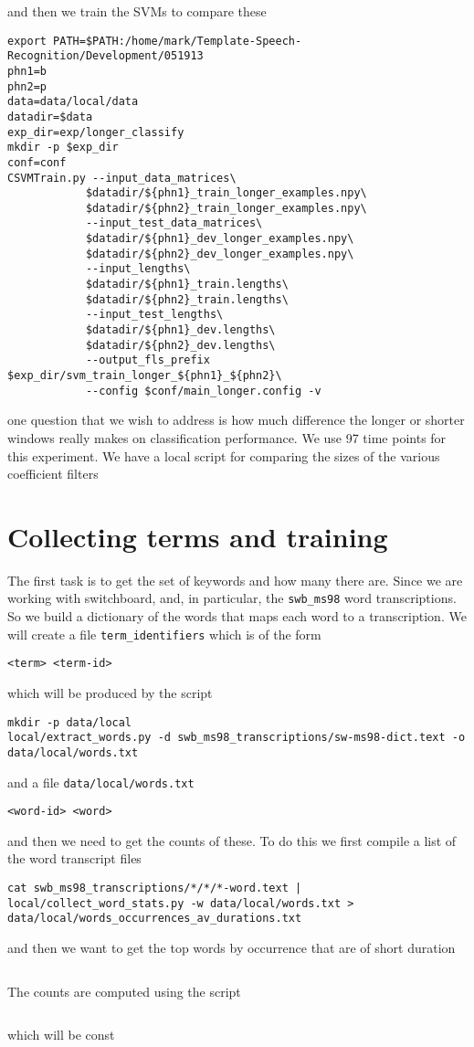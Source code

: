 \documentclass{article}
\begin{document}
and then we train the SVMs to compare these
\begin{verbatim}
export PATH=$PATH:/home/mark/Template-Speech-Recognition/Development/051913
phn1=b
phn2=p
data=data/local/data
datadir=$data
exp_dir=exp/longer_classify
mkdir -p $exp_dir
conf=conf
CSVMTrain.py --input_data_matrices\
            $datadir/${phn1}_train_longer_examples.npy\
            $datadir/${phn2}_train_longer_examples.npy\
            --input_test_data_matrices\
            $datadir/${phn1}_dev_longer_examples.npy\
            $datadir/${phn2}_dev_longer_examples.npy\
            --input_lengths\
            $datadir/${phn1}_train.lengths\
            $datadir/${phn2}_train.lengths\
            --input_test_lengths\
            $datadir/${phn1}_dev.lengths\
            $datadir/${phn2}_dev.lengths\
            --output_fls_prefix $exp_dir/svm_train_longer_${phn1}_${phn2}\
            --config $conf/main_longer.config -v
\end{verbatim}
one question that we wish to address is how much difference the longer
or shorter windows really makes on classification performance.
We use 97 time points for this experiment.
We have a local script for comparing the sizes of the various
coefficient filters


\section{Collecting terms and training}

The first task is to get the set of keywords and how many there are.
Since we are working with switchboard, and, in particular, the
\texttt{swb\_ms98} word transcriptions.  So we build a dictionary of
the words that maps each word to a transcription.
We will create a file \texttt{term\_identifiers} which is of the form
\begin{verbatim}
<term> <term-id>
\end{verbatim}
which will be produced by the script
\begin{verbatim}
mkdir -p data/local
local/extract_words.py -d swb_ms98_transcriptions/sw-ms98-dict.text -o data/local/words.txt
\end{verbatim}
and a file \texttt{data/local/words.txt}
\begin{verbatim}
<word-id> <word>
\end{verbatim}
and then we need to get the counts of these. To do this we first
compile a list of the word transcript files
\begin{verbatim}
cat swb_ms98_transcriptions/*/*/*-word.text | local/collect_word_stats.py -w data/local/words.txt > data/local/words_occurrences_av_durations.txt
\end{verbatim}
and then we want to get the top words by occurrence that are
of short duration
\begin{verbatim}

\end{verbatim}
 The counts are computed
using the script
\begin{verbatim}

\end{verbatim}
which will be const
\end{document}

